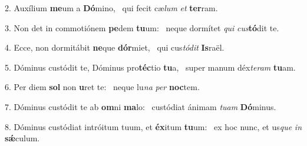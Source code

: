 2. Auxílium \textbf{me}um a \textbf{Dó}mino, \ast\  qui fecit cæ\textit{lum} \textit{et} \textbf{ter}ram.\

3. Non det in commotiónem \textbf{pe}dem \textbf{tu}um: \ast\  neque dormítet \textit{qui} \textit{cus}\textbf{tó}dit te.\

4. Ecce, non dormitábit \textbf{ne}que \textbf{dór}miet, \ast\  qui cus\textit{tó}\textit{dit} \textbf{Is}raël.\

5. Dóminus custódit te, Dóminus pro\textbf{téc}tio \textbf{tu}a, \ast\  super manum déx\textit{te}\textit{ram} \textbf{tu}am.\

6. Per diem \textbf{sol} non \textbf{u}ret te: \ast\  neque lu\textit{na} \textit{per} \textbf{noc}tem.\

7. Dóminus custódit te ab \textbf{om}ni \textbf{ma}lo: \ast\  custódiat ánimam \textit{tu}\textit{am} \textbf{Dó}minus.\

8. Dóminus custódiat intróitum tuum, et \textbf{éx}itum \textbf{tu}um: \ast\  ex hoc nunc, et us\textit{que} \textit{in} \textbf{sǽ}culum.\

